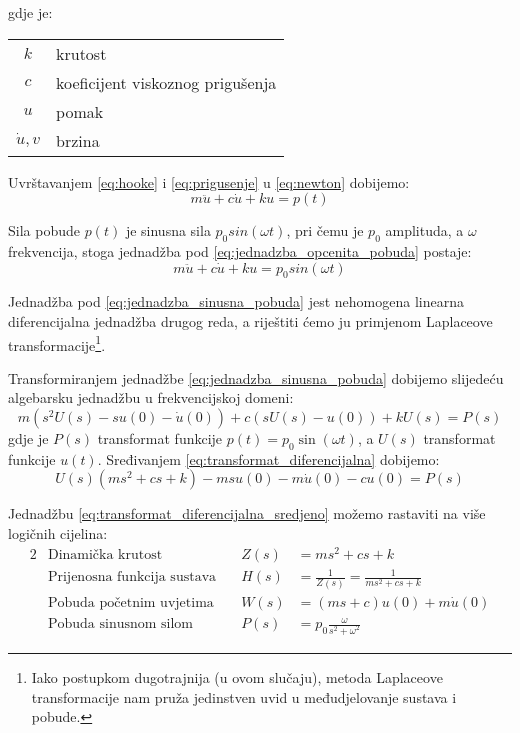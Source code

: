 gdje je:\\
\begin{table}[H]
\begin{tabular}{c l}
	$k$ & krutost \\
	$c$ & koeficijent viskoznog prigušenja \\
	$u$ & pomak \\
	$\dot{u},v$ & brzina \\
\end{tabular}
\end{table}

Uvrštavanjem \eqref{eq:hooke} i \eqref{eq:prigusenje} u \eqref{eq:newton} dobijemo:
\begin{equation}
	m\ddot{u} + c\dot{u} + ku = p(t) \label{eq:jednadzba_opcenita_pobuda}
\end{equation}

Sila pobude $p(t)$ je sinusna sila $p_0sin(\omega t)$, pri čemu je $p_0$ amplituda, a
$\omega$ frekvencija, stoga jednadžba pod \eqref{eq:jednadzba_opcenita_pobuda}
postaje:
\begin{equation}
	m\ddot{u} + c\dot{u} + ku = p_0sin(\omega t)
\label{eq:jednadzba_sinusna_pobuda}
\end{equation} 


Jednadžba pod \eqref{eq:jednadzba_sinusna_pobuda} jest nehomogena linearna
diferencijalna jednadžba drugog reda, a riještiti ćemo ju primjenom Laplaceove
transformacije\footnote{Iako postupkom dugotrajnija (u ovom
slučaju), metoda Laplaceove transformacije nam pruža jedinstven uvid u međudjelovanje sustava
i pobude.}.
\par

Transformiranjem jednadžbe \eqref{eq:jednadzba_sinusna_pobuda} dobijemo 
slijedeću algebarsku jednadžbu u frekvencijskoj domeni:
\begin{equation}\label{eq:transformat_diferencijalna}
        m(s^2U(s)-su(0)-\dot{u}(0))+ c(sU(s)-u(0))+ kU(s) = P(s)
\end{equation}
gdje je $P(s)$ transformat funkcije $p(t)=p_0\sin(\omega t)$, a $U(s)$ transformat
funkcije $u(t)$.
Sređivanjem \eqref{eq:transformat_diferencijalna} dobijemo: 
\begin{equation}\label{eq:transformat_diferencijalna_sredjeno}
    U(s)\left(ms^2+cs+k\right)-msu(0)-m\dot{u}(0)-cu(0) = P(s)
\end{equation}

Jednadžbu \eqref{eq:transformat_diferencijalna_sredjeno} možemo rastaviti na više logičnih
cijelina:
\begin{alignat}{2}
    &\text{Dinamička krutost} & Z(s)&=ms^2+cs+k\label{eq:din_krutost}\\
    &\text{Prijenosna funkcija sustava}\quad & H(s)&=\frac{1}{Z(s)}=\frac{1}{ms^2+cs+k}\label{eq:prijenosna}\\
    &\text{Pobuda početnim uvjetima}\quad & W(s)&=(ms+c)u(0)+m\dot{u}(0)\label{eq:pobuda_pocetni}\\
    &\text{Pobuda sinusnom silom} & P(s)&=p_0\frac{\omega}{s^2+\omega^2}\label{eq:pobuda_sinusna}
\end{alignat}

